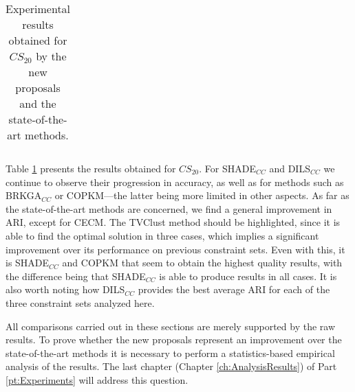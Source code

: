 \begin{table}[!h]
{\begin{tabular}{lcccccccc}
	\end{tabular}}
	
	\caption{Experimental results obtained for $CS_{20}$ by the new proposals and the state-of-the-art methods.}
	\label{tab:resultsSOTA20}
\end{table}

Table \ref{tab:resultsSOTA20} presents the results obtained for $CS_{20}$. For \acs{SHADE}$_{CC}$ and \acs{DILS}$_{CC}$ we continue to observe their progression in accuracy, as well as for methods such as \acs{BRKGA}$_{CC}$ or \acs{COPKM}---the latter being more limited in other aspects. As far as the state-of-the-art methods are concerned, we find a general improvement in \acs{ARI}, except for \acs{CECM}. The \acs{TVClust} method should be highlighted, since it is able to find the optimal solution in three cases, which implies a significant improvement over its performance on previous constraint sets. Even with this, it is \acs{SHADE}$_{CC}$ and \acs{COPKM} that seem to obtain the highest quality results, with the difference being that \acs{SHADE}$_{CC}$ is able to produce results in all cases. It is also worth noting how \acs{DILS}$_{CC}$ provides the best average \acs{ARI} for each of the three constraint sets analyzed here.

\newpage

All comparisons carried out in these sections are merely supported by the raw results. To prove whether the new proposals represent an improvement over the state-of-the-art methods it is necessary to perform a statistics-based empirical analysis of the results. The last chapter (Chapter \ref{ch:AnalysisResults}) of Part \ref{pt:Experiments} will address this question.





















